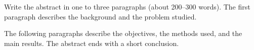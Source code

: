 Write the abstract in one to three paragraphs (about 200--300 words). The first paragraph describes the background and the problem studied.

The following paragraphs describe the objectives, the methods used, and the main results. The abstract ends with a short conclusion.

